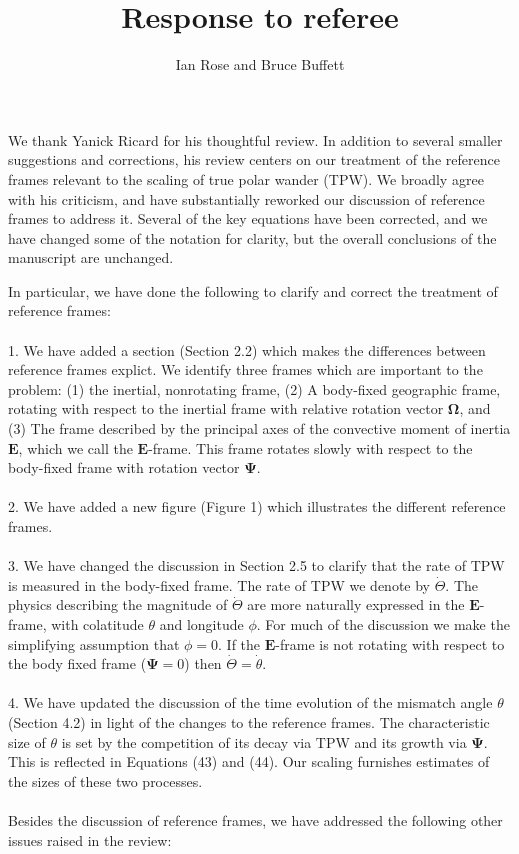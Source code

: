 \documentclass[a4paper,12pt]{article}
\title{Response to referee}
\author{Ian Rose and Bruce Buffett}
\date{}
\begin{document}
\maketitle

We thank Yanick Ricard for his thoughtful review.
In addition to several smaller suggestions and corrections,
his review centers on our treatment of the reference frames relevant to the scaling of true polar wander (TPW).
We broadly agree with his criticism, and have substantially reworked our discussion of reference frames to address it.
Several of the key equations have been corrected, and we have changed some of the notation for clarity,
but the overall conclusions of the manuscript are unchanged.

In particular, we have done the following to clarify and correct the treatment of reference frames:
\\
\\
1. We have added a section (Section 2.2) which makes the differences between reference frames explict.
We identify three frames which are important to the problem: 
(1) the inertial, nonrotating frame, 
(2) A body-fixed geographic frame, rotating with respect to the inertial frame with relative rotation vector $\mathbf{\Omega}$, and
(3) The frame described by the principal axes of the convective moment of inertia $\mathbf{E}$, which we call the $\mathbf{E}$-frame.
This frame rotates slowly with respect to the body-fixed frame with rotation vector $\mathbf{\Psi}$.
\\
\\
2. We have added a new figure (Figure 1) which illustrates the different reference frames.
\\
\\
3. We have changed the discussion in Section 2.5 to clarify that the rate of TPW is measured in the body-fixed frame.
The rate of TPW we denote by $\dot{\Theta}$. The physics describing the magnitude of $\dot{\Theta}$ are 
more naturally expressed in the $\mathbf{E}$-frame, with colatitude $\theta$ and longitude $\phi$. 
For much of the discussion we make the simplifying assumption that $\phi=0$.
If the $\mathbf{E}$-frame is not rotating with respect to the body fixed frame ($\mathbf{\Psi}=0$) then $\dot{\Theta} = \dot{\theta}$.
\\
\\
4. We have updated the discussion of the time evolution of the mismatch angle $\theta$ (Section 4.2)
in light of the changes to the reference frames. The characteristic size of $\theta$ is set by 
the competition of its decay via TPW and its growth via $\mathbf{\Psi}$.
This is reflected in Equations (43) and (44).
Our scaling furnishes estimates of the sizes of these two processes.
\\
\\
Besides the discussion of reference frames, we have addressed the following other issues raised in the review:
\end{document}
